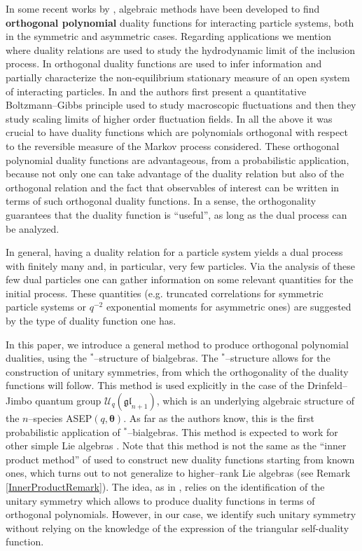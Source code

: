 \documentclass{ximera}
\begin{document}
In some recent works by \cite{FGG, CFGGR, Gro19, CFG21}, algebraic methods have been developed to find \textbf{orthogonal polynomial} duality functions for interacting particle systems, both in the symmetric and asymmetric cases. Regarding applications we mention \cite{FGS} where duality relations are used to study the hydrodynamic limit of the inclusion process. In \cite{FRS} orthogonal duality functions are used to infer information and partially characterize the non-equilibrium stationary measure of an open system of interacting particles. In \cite{ACR18} and \cite{ACR21} the authors first present a quantitative Boltzmann–Gibbs principle used to study macroscopic fluctuations and then they study scaling limits of higher order fluctuation fields. In all the above it was crucial to have duality functions which are polynomials orthogonal with respect to the reversible measure of the Markov process considered. These orthogonal polynomial duality functions are advantageous, from a probabilistic application, because not only one can take advantage of the duality relation but also of the orthogonal relation and the fact that observables of interest can be written in terms of such orthogonal duality functions.  In a sense, the orthogonality guarantees that the duality function is ``useful'', as long as the dual process can be analyzed.




 In general, having a duality relation for a particle system yields a dual process with finitely many and, in particular, very few particles. Via the analysis of these few dual particles one can gather information on  some relevant quantities for the initial process. These quantities (e.g. truncated correlations for symmetric particle systems or $q^{-2}$ exponential moments for asymmetric ones) are suggested by the type of duality function one has.



In this paper, we introduce a general method to produce orthogonal polynomial dualities, using the $^*$--structure of bialgebras. The $^*$--structure allows for the construction of unitary symmetries, from which the orthogonality of the duality functions will follow. This method is used explicitly in the case of the Drinfeld--Jimbo quantum group $\mathcal{U}_q(\mathfrak{gl}_{n+1})$, which is an underlying algebraic structure of the  $n$--species ASEP$(q,\boldsymbol{\theta})$. As far as the authors know, this is the first probabilistic application of $^*$--bialgebras. This method is expected to work for other simple Lie algebras \cite{REU2022}. Note that this method is not the same as the ``inner product method'' of \cite{CFGGR} used to construct new duality functions starting from known ones, which turns out to not generalize to higher--rank Lie algebras (see Remark \ref{InnerProductRemark}). 
The idea, as in \cite{CFGGR}, relies on the identification of the unitary symmetry which allows to produce duality functions in terms of orthogonal polynomials. However, in our case, we identify such unitary symmetry without relying on the knowledge of the expression of the triangular self-duality function.
\end{document}
